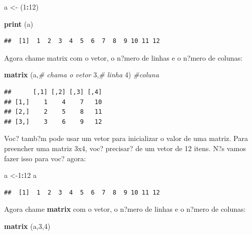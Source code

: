 \documentclass[]{book}
\newenvironment{Shaded}{\begin{snugshade}}{\end{snugshade}}
\newcommand{\CommentTok}[1]{\textcolor[rgb]{0.56,0.35,0.01}{\textit{#1}}}
\newcommand{\DecValTok}[1]{\textcolor[rgb]{0.00,0.00,0.81}{#1}}
\newcommand{\KeywordTok}[1]{\textcolor[rgb]{0.13,0.29,0.53}{\textbf{#1}}}
\newcommand{\NormalTok}[1]{#1}
\newcommand{\OperatorTok}[1]{\textcolor[rgb]{0.81,0.36,0.00}{\textbf{#1}}}
\newcommand{\StringTok}[1]{\textcolor[rgb]{0.31,0.60,0.02}{#1}}
\begin{document}
\begin{Shaded}
\begin{Highlighting}[]
\NormalTok{a <-}\StringTok{ }\NormalTok{(}\DecValTok{1}\OperatorTok{:}\DecValTok{12}\NormalTok{)}

\KeywordTok{print}\NormalTok{ (a)}
\end{Highlighting}
\end{Shaded}

\begin{verbatim}
##  [1]  1  2  3  4  5  6  7  8  9 10 11 12
\end{verbatim}

Agora chame matrix com o vetor, o n?mero de linhas e o n?mero de colunas:

\begin{Shaded}
\begin{Highlighting}[]
\KeywordTok{matrix}\NormalTok{ (a,}\CommentTok{# chama o vetor}
        \DecValTok{3}\NormalTok{,}\CommentTok{# linha}
        \DecValTok{4}\NormalTok{) }\CommentTok{#coluna}
\end{Highlighting}
\end{Shaded}

\begin{verbatim}
##      [,1] [,2] [,3] [,4]
## [1,]    1    4    7   10
## [2,]    2    5    8   11
## [3,]    3    6    9   12
\end{verbatim}

Voc? tamb?m pode usar um vetor para inicializar o valor de uma matriz. Para preencher uma matriz 3x4, voc? precisar? de um vetor de 12 itens. N?s vamos fazer isso para voc? agora:

\begin{Shaded}
\begin{Highlighting}[]
\NormalTok{a <-}\DecValTok{1}\OperatorTok{:}\DecValTok{12}
\NormalTok{a}
\end{Highlighting}
\end{Shaded}

\begin{verbatim}
##  [1]  1  2  3  4  5  6  7  8  9 10 11 12
\end{verbatim}

Agora chame \textbf{matrix} com o vetor, o n?mero de linhas e o n?mero de colunas:

\begin{Shaded}
\begin{Highlighting}[]
\KeywordTok{matrix}\NormalTok{ (a,}\DecValTok{3}\NormalTok{,}\DecValTok{4}\NormalTok{)}
\end{Highlighting}
\end{Shaded}
\end{document}

